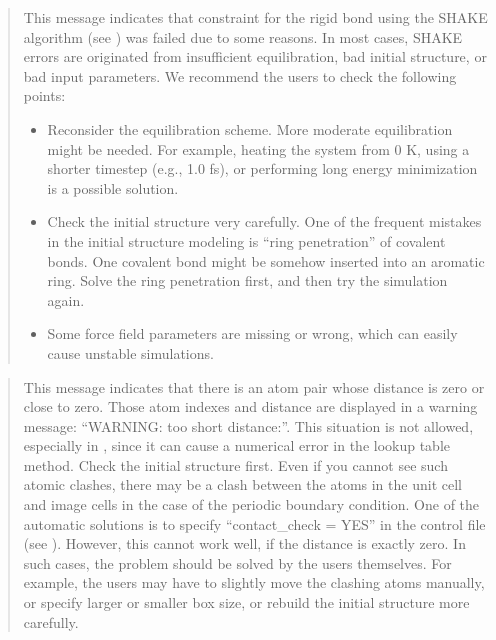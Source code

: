 \documentclass[a4paper,11pt,oneside,english]{sphinxmanual}
\begin{document}
\begin{quote}

This message indicates that constraint for the rigid bond using the SHAKE algorithm (see {\hyperref[\detokenize{08_Constraints:constraints}]{}}) was failed due to some reasons.
In most cases, SHAKE errors are originated from insufficient equilibration, bad initial structure, or bad input parameters.
We recommend the users to check the following points:
\begin{itemize}
\item {} 
Reconsider the equilibration scheme. More moderate equilibration might be needed.
For example, heating the system from 0 K, using a shorter timestep (e.g., 1.0 fs),
or performing long energy minimization is a possible solution.

\item {} 
Check the initial structure very carefully.
One of the frequent mistakes in the initial structure modeling is “ring penetration” of covalent bonds.
One covalent bond might be somehow inserted into an aromatic ring.
Solve the ring penetration first, and then try the simulation again.

\item {} 
Some force field parameters are missing or wrong, which can easily cause unstable simulations.

\end{itemize}
\end{quote}

\begin{quote}

This message indicates that there is an atom pair whose distance is zero or close to zero.
Those atom indexes and distance are displayed in a warning message: “WARNING: too short distance:”.
This situation is not allowed, especially in , since it can cause a numerical error in the lookup table method.
Check the initial structure first. Even if you cannot see such atomic clashes,
there may be a clash between the atoms in the unit cell and image cells in the case of the periodic boundary condition.
One of the automatic solutions is to specify “contact\_check = YES” in the control file (see {\hyperref[\detokenize{05_Energy:energy}]{}}).
However, this cannot work well, if the distance is exactly zero.
In such cases, the problem should be solved by the users themselves.
For example, the users may have to slightly move the clashing atoms manually, or specify larger or smaller box size, or
rebuild the initial structure more carefully.
\end{quote}
\end{document}

